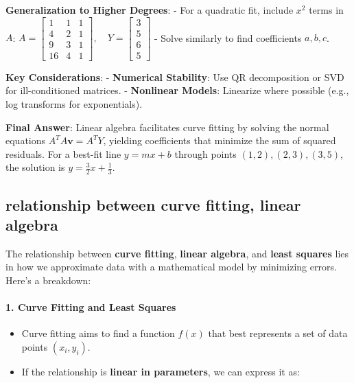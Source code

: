 \documentclass[11pt]{article}
\providecommand{\tightlist}{%
      \setlength{\itemsep}{0pt}\setlength{\parskip}{0pt}}
\begin{document}
\textbf{Generalization to Higher Degrees}: - For a quadratic fit,
include \(x^2\) terms in \(A\):
\(A = \begin{bmatrix} 1 & 1 & 1 \\ 4 & 2 & 1 \\ 9 & 3 & 1 \\ 16 & 4 & 1 \end{bmatrix}, \quad Y = \begin{bmatrix} 3 \\ 5 \\ 6 \\ 5 \end{bmatrix}\)
- Solve similarly to find coefficients \(a, b, c\).

\textbf{Key Considerations}: - \textbf{Numerical Stability}: Use QR
decomposition or SVD for ill-conditioned matrices. - \textbf{Nonlinear
Models}: Linearize where possible (e.g., log transforms for
exponentials).

\textbf{Final Answer}: Linear algebra facilitates curve fitting by
solving the normal equations \(A^T A \mathbf{v} = A^T Y\), yielding
coefficients that minimize the sum of squared residuals. For a best-fit
line \(y = mx + b\) through points \((1,2), (2,3), (3,5)\), the solution
is \(\boxed{y = \frac{3}{2}x + \frac{1}{3}}\).

\subsection{\texorpdfstring{relationship between \textbf{curve fitting},
\textbf{linear
algebra}}{relationship between curve fitting, linear algebra}}\label{relationship-between-curve-fitting-linear-algebra}

The relationship between \textbf{curve fitting}, \textbf{linear
algebra}, and \textbf{least squares} lies in how we approximate data
with a mathematical model by minimizing errors. Here's a breakdown:

\paragraph{\texorpdfstring{\textbf{1. Curve Fitting and Least
Squares}}{1. Curve Fitting and Least Squares}}\label{curve-fitting-and-least-squares}

\begin{itemize}
\tightlist
\item
  Curve fitting aims to find a function \(f(x)\) that best represents a
  set of data points \((x_i, y_i)\).
\item
  If the relationship is \textbf{linear in parameters}, we can express
  it as:
\end{itemize}
\end{document}
